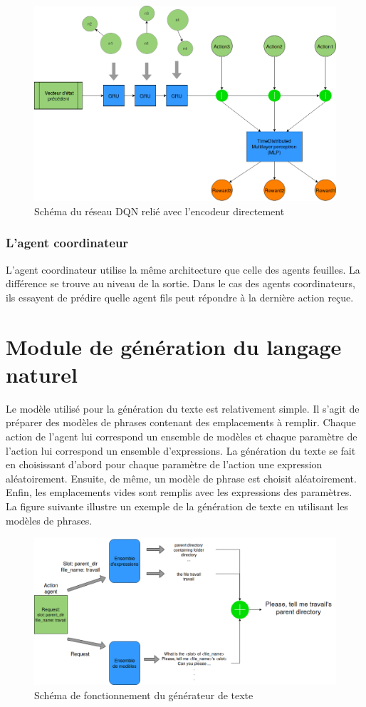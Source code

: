 \begin{figure}[H] 
	\centering
	\includegraphics[width=0.88\linewidth]{images/Conception/DM/encoder_dqn.png}
	\caption{Schéma du réseau DQN relié avec l'encodeur directement}
\end{figure}\label{encoder_dqn}
\subsubsection*{L'agent coordinateur}
L’agent coordinateur utilise la même architecture que celle des agents feuilles. La différence se trouve au niveau de la sortie. Dans le cas des agents coordinateurs, ils essayent de prédire quelle agent fils peut répondre à la dernière action reçue.
\section{Module de génération du langage naturel}
Le modèle utilisé pour la génération du texte est relativement simple. Il s’agit de préparer des modèles de phrases contenant des emplacements à remplir. Chaque action de l’agent lui correspond un ensemble de modèles et chaque paramètre de l’action lui correspond un ensemble d’expressions. La génération du texte se fait en choisissant d’abord pour chaque paramètre de l’action une expression aléatoirement. Ensuite, de même, un modèle de phrase est choisit aléatoirement. Enfin, les emplacements vides sont remplis avec les expressions des paramètres. La figure suivante illustre un exemple de la génération de texte en utilisant les modèles de phrases.
\begin{figure}[H] 
	\centering
	\includegraphics[width=0.95\linewidth]{images/Conception/NLG.png}
	\caption{Schéma de fonctionnement du générateur de texte}
\end{figure}\label{nlg_schema}
